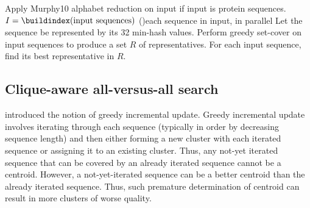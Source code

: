 \documentclass[11pt,letterpaper]{article}
\begin{document}
\begin{algorithm}
	Apply Murphy10 alphabet reduction on input if input is protein sequences.\;
	\(I=\buildindex(\textnormal{input sequences})\) \;
	\For(){each sequence in input, in parallel}{
		Let the sequence be represented by its 32 min-hash values. \;
	}
	Perform greedy set-cover on input sequences to produce a set \(R\) of representatives.\;
	For each input sequence, find its best representative in \(R\).\;
	\;
\end{algorithm}

\subsection{Clique-aware all-versus-all search}
\label{subsec:clique-aware}
 introduced the notion of greedy incremental update.
Greedy incremental update involves iterating through each sequence (typically in order by decreasing sequence length) and then either forming a new cluster with each iterated sequence or assigning it to an existing cluster. Thus, any not-yet iterated sequence that can be covered by an already iterated sequence cannot be a centroid. However, a not-yet-iterated sequence can be a better centroid than the already iterated sequence. Thus, such premature determination of centroid can result in more clusters of worse quality.

\end{document}
